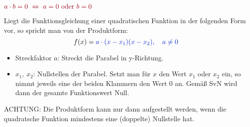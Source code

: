 \setlength{\qrheight}{2.5cm}%
\newlength{\produktbox}
\iftoggle{qrcode}{\setlength{\produktbox}{\textwidth-\qrheight}}{\setlength{\produktbox}{\textwidth}}%
%
\iftoggle{qrcode}{%
    \adjustbox{valign=t}{\begin{minipage}{\qrheight}\href{https://www.geogebra.org/m/weczkmhe}{\texttt{[image: \\quadFkt/pics/ProduktformQR.png]}}\end{minipage}}%
}{}%
\begin{tcolorbox}\centering
	\(\textcolor{loestc}{a\cdot b=0\ \Leftrightarrow\ a=0\text{ oder }b=0}\)
\end{tcolorbox}
Liegt die Funktionsgleichung einer quadratischen Funktion in der folgenden Form vor, so spricht man von der Produktform:
\[f(x)=\textcolor{loes}{a\cdot \left(x-x_1\right)\left(x-x_2\right), \quad a\neq 0}\]
\begin{itemize}
	\item Streckfaktor \(a\): \textcolor{loes}{Streckt die Parabel in y-Richtung.}\vspace{0.8cm}
	\item \(x_1,\ x_2\): \textcolor{loes}{Nullstellen der Parabel. Setzt man für \(x\) den Wert \(x_1\) oder \(x_2\) ein, so nimmt jeweils eine der beiden Klammern den Wert 0 an. Gemäß SvN wird dann der gesamte Funktionswert Null.}\vspace{0.8cm}
\end{itemize}
\begin{tcolorbox}\centering
	\textcolor{loestc}{ACHTUNG: Die Produktform kann nur dann aufgestellt werden, wenn die quadratsche Funktion mindestens eine (doppelte) Nullstelle hat.}
\end{tcolorbox}

